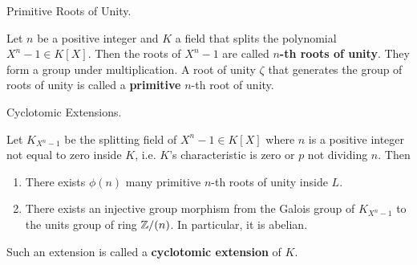 \documentclass[../book.tex]{subfiles}
\begin{document}
\begin{dfn} Primitive Roots of Unity.
    
    Let $n$ be a positive integer and 
    $K$ a field that splits the polynomial $X^n - 1 \in K[X]$.
    Then the roots of $X^n - 1$ are called \textbf{$n$-th roots of unity}.
    They form a group under multiplication. 
    A root of unity $\zeta$ that generates the group of roots of unity
    is called a \textbf{primitive} $n$-th root of unity. 
    
\end{dfn}
\begin{thm} Cyclotomic Extensions.
    
    Let $K_{X^n - 1}$ be the splitting field of $X^n - 1 \in K[X]$
    where $n$ is a positive integer not equal to zero inside $K$,
    i.e. $K$'s characteristic is zero or $p$ not dividing $n$.
    Then \begin{enumerate}
        \item There exists $\phi(n)$ many 
        primitive $n$-th roots of unity inside $L$.
        \item There exists an injective group morphism from 
        the Galois group of $K_{X^n - 1}$ 
        to the units group of ring $\mathbb{Z}/(n)$.
        In particular, it is abelian.
    \end{enumerate}
    Such an extension is called a \textbf{cyclotomic extension} of $K$.
    
\end{thm}
\end{document}
